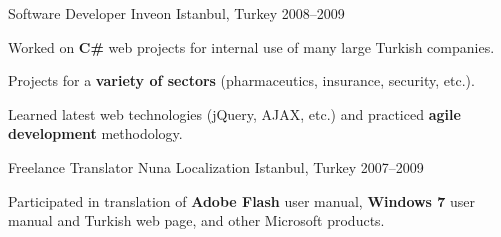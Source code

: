\begin{cventries}
  \cventry
    {Software Developer} %
    {Inveon} %
    {Istanbul, Turkey} %
    {2008--2009} %
    {
      \begin{cvitems} %
        \item {Worked on \textbf{C\#} web projects for internal use of many large Turkish companies.}
        \item {Projects for a \textbf{variety of sectors} (pharmaceutics, insurance, security, etc.).}
        \item {Learned latest web technologies (jQuery, AJAX, etc.) and practiced \textbf{agile development} methodology.}
      \end{cvitems}
    }

  \cventry
    {Freelance Translator} %
    {Nuna Localization} %
    {Istanbul, Turkey} %
    {2007--2009} %
    {
      \begin{cvitems} %
        \item {Participated in translation of \textbf{Adobe Flash} user manual, \textbf{Windows 7} user manual and Turkish web page, and other Microsoft products.}
      \end{cvitems}
    }

\end{cventries}
